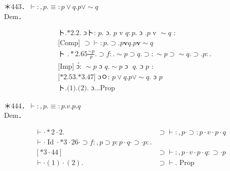 \documentclass[10pt]{article}
\begin{document}
＊443．$\vdash:, p . \equiv: p \vee q . p \vee \sim q$\\
Dem．


\begin{align*}
& \text { ト.*2.2. ɔト: } p . \text { ɔ. } p \text { v } q: p . \text { ɔ } . p \text { v } \sim q \text { : } \\
& \text { [Comp] } \supset \vdash: p . \supset . p \mathbf{v} q . p \mathbf{v} \sim q  \tag{1}\\
& \text { ト } . * 2.65 \frac{\sim p}{p} . \supset f: . \sim p \supset q . \supset: \sim p \supset \sim q . \supset . p: . \\
& \text { [Imp] ɔํ: } \sim p \text { ɔ } q . \sim p \text { ɔ~ } q . \text { ɔ } p \text { : } \\
& \text { [*2.53.*3.47] ɔㅇ: } p \vee q . p \vee \sim q . \text { ɔ } p  \tag{2}\\
& \text { ト.(1).(2). ɔ…Prop }
\end{align*}


＊444．$\vdash:, p . \equiv: p . v . p . q$\\
Dem．

\[
\begin{array}{ll}
\vdash \cdot * 2 \cdot 2 . & \supset \vdash:, p \cdot \supset: p \cdot v \cdot p \cdot q \\
\vdash \cdot \operatorname{Id} \cdot * 3 \cdot 26 \cdot \supset f:, p \supset p: p \cdot q \cdot \supset \cdot p: . \\
{[* 3 \cdot 44]} & \supset \vdash:, p \cdot v \cdot p \cdot q: \supset \cdot p  \tag{2}\\
\vdash \cdot(1) \cdot(2) . & \supset \vdash . \text { Prop }
\end{array}
\]
\end{document}
